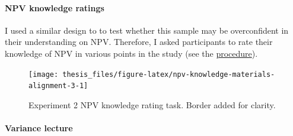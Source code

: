 \documentclass[a4paper, nobind, dvipsnames]{templates/ociamthesis}
\theoremstyle{definition}
\theoremstyle{definition}
\theoremstyle{definition}
\theoremstyle{definition}
\theoremstyle{remark}
\begin{document}
\hypertarget{npv-knowledge-materials-alignment-3}{%
\paragraph{NPV knowledge ratings}\label{npv-knowledge-materials-alignment-3}}

I used a similar design to \textcite[Study 1]{long2018} to test whether this sample may
be overconfident in their understanding on NPV. Therefore, I asked participants
to rate their knowledge of NPV in various points in the study (see the
\protect\hyperlink{procedure-alignment-3}{procedure}).



\begin{figure}
\texttt{[image: thesis\_files/figure-latex/npv-knowledge-materials-alignment-3-1]} \caption{Experiment 2 NPV knowledge rating task. Border added for clarity.}\label{fig:npv-knowledge-materials-alignment-3}
\end{figure}

\hypertarget{variance-lecture-materials-alignment-3}{%
\paragraph{Variance lecture}\label{variance-lecture-materials-alignment-3}}
\end{document}

